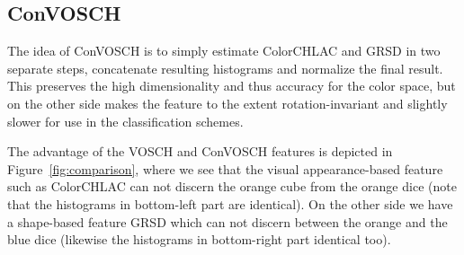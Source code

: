 \documentclass[conference]{sty/IEEEtran}
\begin{document}
\subsection{ConVOSCH}
The idea of ConVOSCH is to simply estimate ColorCHLAC and GRSD in two separate steps, 
concatenate resulting histograms and normalize the final result. This preserves the 
high dimensionality and thus accuracy for the color space, but on the other side 
makes the feature to the extent rotation-invariant and slightly slower for use 
in the classification schemes.
\vspace{2ex}

The advantage of the VOSCH and ConVOSCH features is depicted in Figure~\ref{fig:comparison},
where we see that the visual appearance-based feature such as ColorCHLAC can not
discern the orange cube from the orange dice (note that the histograms in bottom-left part are identical). 
On the other side we have a shape-based feature GRSD
which can not discern between the orange and the blue dice (likewise the
histograms in bottom-right part identical too).
\end{document}
